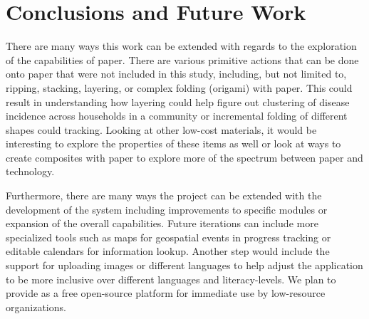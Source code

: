 \documentclass{sig-alternate}
\begin{document}






\section{Conclusions and Future Work}
\label{sec:future-work}

There are many ways this work can be extended with regards to the exploration of the capabilities of paper. There are various primitive actions that can be done onto paper that were not included in this study, including, but not limited to, ripping, stacking, layering, or complex folding (origami) with paper. This could result in understanding how layering could help figure out clustering of disease incidence across households in a community or incremental folding of different shapes could  tracking. Looking at other low-cost materials, it would be interesting to explore the properties of these items as well or look at ways to create composites with paper to explore more of the spectrum between paper and technology.

Furthermore, there are many ways the project can be extended with the development of the \nifty system including improvements to specific modules or expansion of the overall capabilities. Future iterations can include more specialized tools such as maps for geospatial events in progress tracking or editable calendars for information lookup. Another step would include the support for uploading images or different languages to help adjust the application to be more inclusive over different languages and literacy-levels. We plan to provide \nifty as a free open-source platform for immediate use by low-resource organizations.
\end{document}
